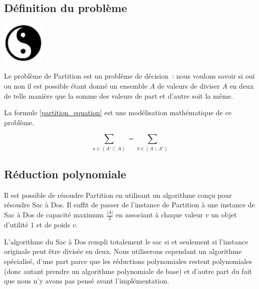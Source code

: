 \subsection{Définition du problème}

\begin{minipage}[b]{0.3\linewidth}
\centering
\includegraphics[height=2cm]{../images/yin_yang.png}
\end{minipage}
\hspace{0.5cm}
\begin{minipage}[b]{0.7\linewidth}
Le problème de Partition est un problème de décision~: nous voulons
savoir si oui ou non il est possible étant donné un ensemble $A$ de
valeurs de diviser $A$ en deux de telle manière que la somme des
valeurs de part et d'autre soit la même.
\end{minipage}

La formule \ref{partition_equation} est une modélisation mathématique
de ce problème.

\begin{equation}
\sum_{a \in (A' \subset A) } = \sum_{b \in (A \backslash A')}
\label{partition_equation}
\end{equation}

\subsection{Réduction polynomiale}

Il est possible de résoudre Partition en utilisant un algorithme conçu
pour résoudre Sac à Dos. Il suffit de passer de l'instance de
Partition à une instance de Sac à Dos de capacité maximum
$\frac{|A|}{2}$ en associant à chaque valeur $v$ un objet d'utilité
$1$ et de poids $v$.

L'algorithme du Sac à Dos rempli totalement le sac si et seulement si
l'instance originale peut être divisée en deux. Nous utiliserons
cependant un algorithme spécialisé, d'une part parce que les
réductions polynomiales restent polynomiales (donc autant prendre un
algorithme polynomiale de base) et d'autre part du fait que nous n'y
avons pas pensé avant l'implémentation.


